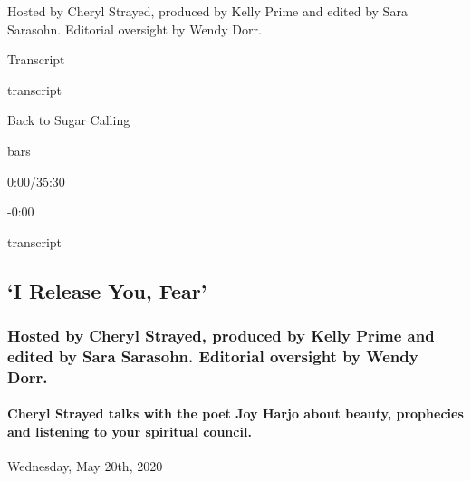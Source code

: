 Hosted by Cheryl Strayed, produced by Kelly Prime and edited by Sara
Sarasohn. Editorial oversight by Wendy Dorr.

Transcript

transcript

Back to Sugar Calling

bars

0:00/35:30

-0:00

transcript

\hypertarget{i-release-you-fear-2}{%
\subsection{`I Release You, Fear'}\label{i-release-you-fear-2}}

\hypertarget{hosted-by-cheryl-strayed-produced-by-kelly-prime-and-edited-by-sara-sarasohn-editorial-oversight-by-wendy-dorr-1}{%
\subsubsection{Hosted by Cheryl Strayed, produced by Kelly Prime and
edited by Sara Sarasohn. Editorial oversight by Wendy
Dorr.}\label{hosted-by-cheryl-strayed-produced-by-kelly-prime-and-edited-by-sara-sarasohn-editorial-oversight-by-wendy-dorr-1}}

\hypertarget{cheryl-strayed-talks-with-the-poet-joy-harjo-about-beauty-prophecies-and-listening-to-your-spiritual-council-2}{%
\paragraph{Cheryl Strayed talks with the poet Joy Harjo about beauty,
prophecies and listening to your spiritual
council.}\label{cheryl-strayed-talks-with-the-poet-joy-harjo-about-beauty-prophecies-and-listening-to-your-spiritual-council-2}}

Wednesday, May 20th, 2020


